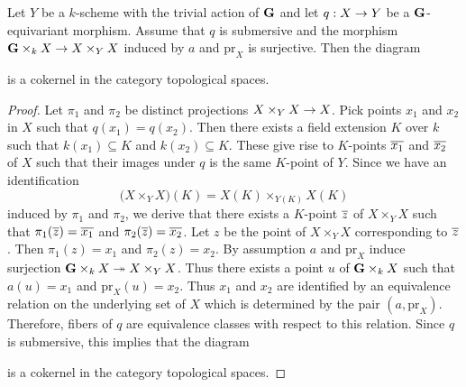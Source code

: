 \begin{proposition}\label{proposition:topological_group_quotient_is_implied_by_submersive_and_kernel_pair}
Let $Y$ be a $k$-scheme with the trivial action of $\mathbf{G}$ and let $q:X\rightarrow Y$ be a $\mathbf{G}$-equivariant morphism. Assume that $q$ is submersive and the morphism $\mathbf{G}\times_kX\rightarrow X\times_YX$ induced by $a$ and $\mathrm{pr}_X$ is surjective. Then the diagram
\begin{center}
\end{center}
is a cokernel in the category topological spaces.
\end{proposition}
\begin{proof}
Let $\pi_1$ and $\pi_2$ be distinct projections $X\times_YX\rightarrow X$. Pick points $x_1$ and $x_2$ in $X$ such that $q(x_1) = q(x_2)$. Then there exists a field extension $K$ over $k$ such that $k(x_1)\subseteq K$ and $k(x_2)\subseteq K$. These give rise to $K$-points $\overline{x_1}$ and $\overline{x_2}$ of $X$ such that their images under $q$ is the same $K$-point of $Y$. Since we have an identification
$$\big(X\times_YX\big)(K) = X(K)\times_{Y(K)}X(K)$$ 
induced by $\pi_1$ and $\pi_2$, we derive that there exists a $K$-point $\overline{z}$ of $X\times_YX$ such that $\pi_1(\overline{z}) = \overline{x_1}$ and $\pi_2(\overline{z}) = \overline{x_2}$. Let $z$ be the point of $X\times_YX$ corresponding to $\overline{z}$. Then $\pi_1(z) = x_1$ and $\pi_2(z) = x_2$. By assumption $a$ and $\mathrm{pr}_X$ induce surjection $\mathbf{G}\times_kX\twoheadrightarrow X\times_YX$. Thus there exists a point $u$ of $\mathbf{G}\times_kX$ such that $a(u) = x_1$ and $\mathrm{pr}_X(u) = x_2$. Thus $x_1$ and $x_2$ are identified by an equivalence relation on the underlying set of $X$ which is determined by the pair $(a, \mathrm{pr}_X)$. Therefore, fibers of $q$ are equivalence classes with respect to this relation. Since $q$ is submersive, this implies that the diagram
\begin{center}
\end{center}
is a cokernel in the category topological spaces.
\end{proof}

